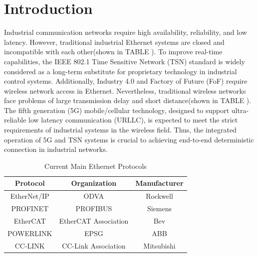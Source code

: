 \documentclass[english]{cccconf}
\begin{document}
{\section{Introduction}
Industrial communication networks require high availability, reliability, and low latency. However, traditional industrial Ethernet systems are closed and incompatible with each other(shown in TABLE \uppercase\expandafter{}). To improve real-time capabilities, the IEEE 802.1 Time Sensitive Network (TSN) standard is widely considered as a long-term substitute for proprietary technology in industrial control systems. Additionally, Industry 4.0 and Factory of Future (FoF) require wireless network access in Ethernet. Nevertheless, traditional wireless networks face problems of large transmission delay and short distance\cite{2013Recommendations}(shown in TABLE \uppercase\expandafter{}). The fifth generation (5G) mobile/cellular technology, designed to support ultra-reliable low latency communication (URLLC), is expected to meet the strict requirements of industrial systems in the wireless field. Thus, the integrated operation of 5G and TSN systems is crucial to achieving end-to-end deterministic connection in industrial networks.
\begin{table}[htbp]
	\caption{Current Main Ethernet Protocols}
	\begin{center}
		\begin{tabular}{|c|c|c|}
			\hline
			\textbf{Protocol}& \textbf{Organization}& \textbf{Manufacturer} \\
			\hline
			EtherNet/IP
			& ODVA
			& Rockwell \\
			\hline
			PROFINET
			& PROFIBUS
			& Siemens \\
			\hline
			EtherCAT
			& EtherCAT Association
			& Bev \\
			\hline
			POWERLINK
			& EPSG
			& ABB \\
			\hline
			CC-LINK
			& CC-Link Association
			& Mitsubishi \\
			\hline 						
		\end{tabular}
		\label{tab1}
	\end{center}
\end{table}

}
\end{document}
